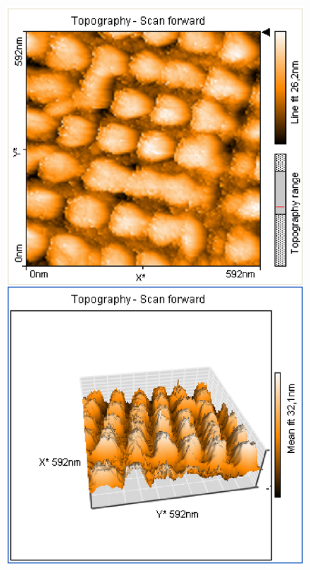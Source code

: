 \documentclass[12pt]{article}
\begin{document}
\begin{figure}[H]
\begin{minipage}{0.4\linewidth}
\includegraphics[width=0.9\linewidth]{../plot/data/goldgitter/goldgitter4.eps}
\end{minipage}
\end{figure}
\end{document}
